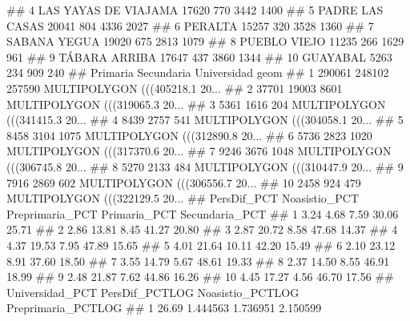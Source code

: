 \documentclass[11pt,]{article}
\newenvironment{Shaded}{\begin{snugshade}}{\end{snugshade}}
\newcommand{\NormalTok}[1]{#1}
\begin{document}
\begin{Shaded}
\begin{Highlighting}[]
{\NormalTok{## 4     LAS YAYAS DE VIAJAMA     17620     770      3442        1400}
\NormalTok{## 5          PADRE LAS CASAS     20041     804      4336        2027}
\NormalTok{## 6                  PERALTA     15257     320      3528        1360}
\NormalTok{## 7             SABANA YEGUA     19020     675      2813        1079}
\NormalTok{## 8             PUEBLO VIEJO     11235     266      1629         961}
\NormalTok{## 9            TÁBARA ARRIBA     17647     437      3860        1344}
\NormalTok{## 10                GUAYABAL      5263     234       909         240}
\NormalTok{##    Primaria Secundaria Universidad                           geom}
\NormalTok{## 1    290061     248102      257590 MULTIPOLYGON (((405218.1 20...}
\NormalTok{## 2     37701      19003        8601 MULTIPOLYGON (((319065.3 20...}
\NormalTok{## 3      5361       1616         204 MULTIPOLYGON (((341415.3 20...}
\NormalTok{## 4      8439       2757         541 MULTIPOLYGON (((304058.1 20...}
\NormalTok{## 5      8458       3104        1075 MULTIPOLYGON (((312890.8 20...}
\NormalTok{## 6      5736       2823        1020 MULTIPOLYGON (((317370.6 20...}
\NormalTok{## 7      9246       3676        1048 MULTIPOLYGON (((306745.8 20...}
\NormalTok{## 8      5270       2133         484 MULTIPOLYGON (((310447.9 20...}
\NormalTok{## 9      7916       2869         602 MULTIPOLYGON (((306556.7 20...}
\NormalTok{## 10     2458        924         479 MULTIPOLYGON (((322129.5 20...}
\NormalTok{##    PersDif_PCT Noasistio_PCT Preprimaria_PCT Primaria_PCT Secundaria_PCT}
\NormalTok{## 1         3.24          4.68            7.59        30.06          25.71}
\NormalTok{## 2         2.86         13.81            8.45        41.27          20.80}
\NormalTok{## 3         2.87         20.72            8.58        47.68          14.37}
\NormalTok{## 4         4.37         19.53            7.95        47.89          15.65}
\NormalTok{## 5         4.01         21.64           10.11        42.20          15.49}
\NormalTok{## 6         2.10         23.12            8.91        37.60          18.50}
\NormalTok{## 7         3.55         14.79            5.67        48.61          19.33}
\NormalTok{## 8         2.37         14.50            8.55        46.91          18.99}
\NormalTok{## 9         2.48         21.87            7.62        44.86          16.26}
\NormalTok{## 10        4.45         17.27            4.56        46.70          17.56}
\NormalTok{##    Universidad_PCT PersDif_PCTLOG Noasistio_PCTLOG Preprimaria_PCTLOG}
\NormalTok{## 1            26.69       1.444563         1.736951           2.150599}
}
\end{Highlighting}
\end{Shaded}
\end{document}
